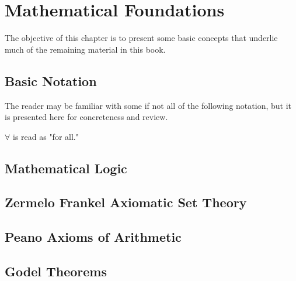 \chapter{Mathematical Foundations}

The objective of this chapter is to present some basic concepts that underlie much of the remaining material in this book.

\section{Basic Notation}

The reader may be familiar with some if not all of the following notation, but it is presented here for concreteness and review.

$\forall$ is read as "for all."


\section{Mathematical Logic}

\section{Zermelo Frankel Axiomatic Set Theory} 

\section{Peano Axioms of Arithmetic}

\section{Godel Theorems}
